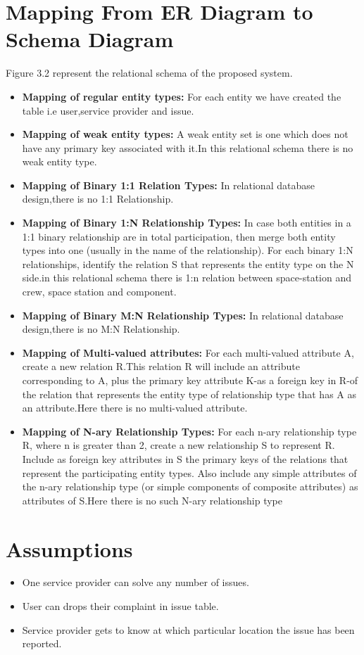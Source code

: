 \documentclass[12pt,a4paper]{report}
\begin{document}
\section{Mapping From ER Diagram to Schema Diagram}
Figure 3.2 represent the relational schema of the proposed system.
\begin{itemize}
\item\textbf{Mapping of regular entity types:}
For each entity we have created the table i.e user,service provider and issue.
\item\textbf{Mapping of weak entity types:}
A weak entity set is one which does not have any primary key associated with it.In this relational schema there is no weak entity type.
\item\textbf{Mapping of Binary 1:1 Relation Types:}
In relational database design,there is no 1:1 Relationship.
\item\textbf{Mapping of Binary 1:N Relationship Types:}
In case both entities in a 1:1 binary relationship are in total participation, then merge both entity types into one (usually in the name of the relationship). For each binary 1:N relationships, identify the relation S that represents the entity type on the N side.in this relational schema there is  1:n relation between space-station and crew, space station and component.
\item\textbf{Mapping of Binary M:N Relationship Types:}
In relational database design,there is no M:N Relationship.
\item\textbf{Mapping of Multi-valued attributes:}
For each multi-valued attribute A, create a new relation R.This relation R will include an attribute corresponding to A, plus the primary key attribute K-as a foreign key in R-of the relation that represents the entity type of relationship type that has A as an attribute.Here there is no multi-valued attribute.
\item\textbf{Mapping of N-ary Relationship Types:}
For each n-ary relationship type R, where n is greater than 2, create a new relationship S to represent R.
Include as foreign key attributes in S the primary keys of the relations that represent the participating entity types. 
Also include any simple attributes of the n-ary relationship type (or simple components of composite attributes) as attributes of S.Here there is no such N-ary relationship type
\end{itemize}
\newpage
\section{Assumptions}
\begin{itemize}
	\item One service provider can solve any number of issues.
	\item User can drops their complaint in issue table.
	\item Service provider gets to know at which particular location the issue has been reported.
	
\end{itemize}
\end{document}
